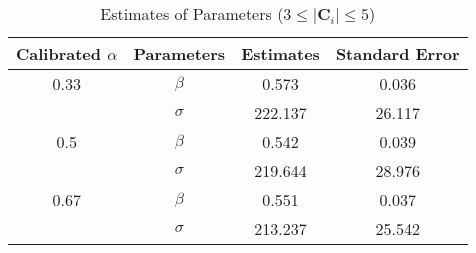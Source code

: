 \begin{table}[H]
\centering
\caption{Estimates of Parameters ($3 \leq |\mathbf{C}_i| \leq 5$)}
\label{table: estimates (min_size=3 max_size=5 margin=3000)}
\begin{tabular}{cccc}
\toprule
Calibrated $\alpha$ & Parameters & Estimates & Standard Error \\
\midrule
0.33 & $\beta$ & 0.573 & 0.036 \\
 & $\sigma$ & 222.137 & 26.117 \\
0.5 & $\beta$ & 0.542 & 0.039 \\
 & $\sigma$ & 219.644 & 28.976 \\
0.67 & $\beta$ & 0.551 & 0.037 \\
 & $\sigma$ & 213.237 & 25.542 \\
\bottomrule
\end{tabular}
\end{table}
